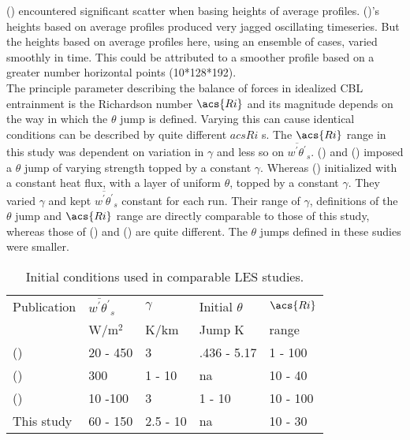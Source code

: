 \citeauthor{BrooksFowler2} (\citeyear{BrooksFowler2}) encountered significant scatter when basing heights of average profiles.  \citeauthor{SullMoengStev} (\citeyear{SullMoengStev})'s heights based on average profiles produced very jagged oscillating timeseries. But the heights based on average profiles here, using an ensemble of cases, varied smoothly in time.  This could be attributed to a smoother profile based on a greater number horizontal points (10*128*192).\\

The principle parameter describing the balance of forces in idealized \acs{CBL} entrainment is the Richardson number $\acs{Ri}$ and its magnitude depends on the way in which the $\theta$ jump is defined.  Varying this can cause identical conditions can be described by quite different $acs{Ri}$ s.  The $\acs{Ri}$ range in this study was dependent on variation in $\gamma$ and less so on 
$\overline{w^{'}\theta^{'}}_{s}$.  \citeauthor{BrooksFowler2} (\citeyear{BrooksFowler2}) and \citeauthor{SullMoengStev} (\citeyear{SullMoengStev}) imposed a $\theta$ jump of varying strength topped by a constant $\gamma$.  Whereas \citeauthor{FedConzMir04} (\citeyear{FedConzMir04}) initialized with a constant heat flux, with a layer of uniform $\theta$, topped by a constant $\gamma$.  They varied $\gamma$ and kept $\overline{w^{'}\theta^{'}}_{s}$ constant for each run.  Their range of $\gamma$, definitions of the $\theta$ jump and $\acs{Ri}$ range are directly comparable to those of this study, whereas those of \citeauthor{BrooksFowler2} (\citeyear{BrooksFowler2}) and \citeauthor{SullMoengStev} (\citeyear{SullMoengStev}) are quite different.  The $\theta$ jumps defined in these sudies were smaller.\\    

\begin{table}[htbp]
\caption[]{Initial conditions used in comparable \acs{LES} studies.}

    \begin{center}
    \begin{tabular}{ p{4cm} p{1.4cm} p{1.4cm} p{1.7cm} p{1.8cm}}
Publication & $\overline{w^{'}\theta^{'}}_{s}$& $\gamma$& Initial $\theta$ & $\acs{Ri}$ \\ 
& W/m$^{2}$ & K/km & Jump K & range \\ \hline
      \citeauthor{SullMoengStev} (\citeyear{SullMoengStev}) & 20 - 450& 3  &.436 - 5.17 & 1 - 100\\ %
      \citeauthor{FedConzMir04} (\citeyear{FedConzMir04}) & 300 & 1 - 10 & na & 10 - 40\\ %
      \citeauthor{BrooksFowler2} (\citeyear{BrooksFowler2}) &  10 -100 &  3& 1 - 10 &10 - 100 \\ %
      This study & 60 - 150 & 2.5 - 10& na & 10 - 30\\ \hline 
      
    \end{tabular}
\label{table:initconditcomp}   
\end{center}    
\end{table}



